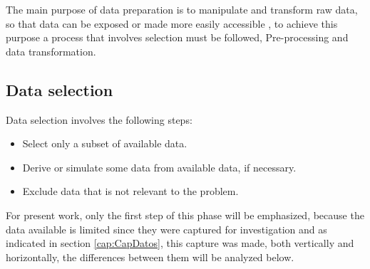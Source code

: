 \vspace{5mm} %

The main purpose of data preparation is to manipulate and transform raw data, so that data can be exposed or made more easily accessible \cite{Reference37}, to achieve this purpose a process that involves selection must be followed, Pre-processing and data transformation.
 
\subsection{Data selection}

Data selection involves the following steps:

\begin{itemize}
\item Select only a subset of available data.
\item Derive or simulate some data from available data, if necessary.
\item Exclude data that is not relevant to the problem.
\end{itemize}

For present work, only the first step of this phase will be emphasized, because the data available is limited since they were captured for investigation and as indicated in section \ref{cap:CapDatos}, this capture was made, both vertically and horizontally, the differences between them will be analyzed below.

